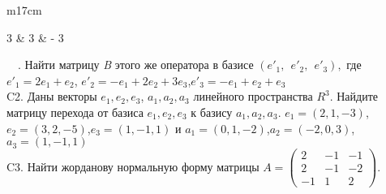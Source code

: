 \documentclass{article}
\begin{document}
\begin{tabular}{m{17cm}}
\begin{bmatrix}
3 & 3 & - 3
\end{bmatrix}\ \ .\) Найти матрицу \emph{B} этого же оператора в базисе \(({e'}_{1},\ \ {e'}_{2},\ \ {e'}_{3}),\) где \({e'}_{1} = 2e_{1} + e_{2}\), \({e'}_{2} = - e_{1} + 2e_{2} + 3e_{3}\),\({e'}_{3} = - e_{1} + e_{2} + e_{3}\) \\
C2. 
Даны векторы \(e_{1},e_{2},e_{3}\), \(a_{1},a_{2},a_{3}\) линейного пространства \(R^{3}\). Найдите матрицу перехода от базиса \(e_{1},e_{2},e_{3}\) к базису \(a_{1},a_{2},a_{3}\).
\(e_{1} = (2,1, - 3)\),\(e_{2} = (3,2, - 5)\),\(e_{3} = (1, - 1,1)\) и \(a_{1} = (0,1, - 2)\),\(a_{2} = ( - 2,0,3)\),\(a_{3} = (1, - 1,1)\) \\
C3. Найти жорданову нормальную форму матрицы \(A = \begin{pmatrix}
2 & - 1 & - 1 \\
2 & - 1 & - 2 \\
 - 1 & 1 & 2
\end{pmatrix}\). \\

\end{tabular}
\vspace{1cm}
\end{document}
